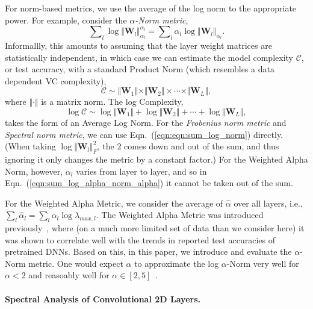 For norm-based metrics, we use the average of the log norm to the appropriate power.
For example, consider the \emph{$\alpha$-Norm metric}, 
\begin{equation}
\label{eqn:sum_log_alpha_norm_alpha}
\sum\nolimits_l \log \Vert\mathbf{W}_l\Vert_{\alpha_l}^{\alpha_l} 
=
\sum\nolimits_l \alpha_l \log \Vert\mathbf{W}_l\Vert_{\alpha_l} .
\end{equation}
Informallly, this amounts to assuming that the layer weight matrices are statistically independent, in which case we can estimate the model complexity $\mathcal{C}$, or test accuracy, with a standard Product Norm (which resembles a data dependent VC complexity),
\begin{equation}
\mathcal{C}\sim\Vert\mathbf{W}_{1}\Vert\times\Vert\mathbf{W}_{2}\Vert \times \cdots \times \Vert\mathbf{W}_{L}\Vert ,
\end{equation}
where $\Vert\cdot\Vert$ is a matrix norm.   
The log Complexity,
\begin{equation}
\label{eqn:eqn:sum_log_norm}
\log\mathcal{C} \sim \log\Vert\mathbf{W}_{1}\Vert+\log\Vert\mathbf{W}_{2}\Vert + \cdots + \log\Vert\mathbf{W}_{L}\Vert  ,
\end{equation}
 takes the form of an Average Log Norm.
For the \emph{Frobenius norm metric} and \emph{Spectral norm metric}, we can use Eqn.~(\ref{eqn:eqn:sum_log_norm}) directly. 
(When taking $\log\Vert\mathbf{W}_{l}\Vert_{F}^{2}$, the $2$ comes down and out of the sum, and thus ignoring it only changes the metric by a constant factor.)
For the Weighted Alpha Norm, however, $\alpha_l$ varies from layer to layer, and so in Eqn.~(\ref{eqn:sum_log_alpha_norm_alpha}) it cannot be taken out of the sum.


For the Weighted Alpha Metric, we consider the average of $\hat{\alpha}$ over all layers, i.e., 
$ %
\sum_l \hat{\alpha}_l = \sum_l \alpha_l\log\lambda_{max,l}  .  
$ %
The Weighted Alpha Metric was introduced previously~\cite{MM20_SDM}, where (on a much more limited set of data than we consider here) it was shown to correlate well with the trends in reported test accuracies of pretrained DNNs.
Based on this, in this paper, we introduce and evaluate the $\alpha$-Norm metric.
One would expect $\hat{\alpha}$ to approximate the log $\alpha$-Norm very well for $\alpha < 2$ and reasoably well for $\alpha\in[2,5]$~\cite{MM20_unpub_work}.




\paragraph{Spectral Analysis of Convolutional 2D Layers.}

